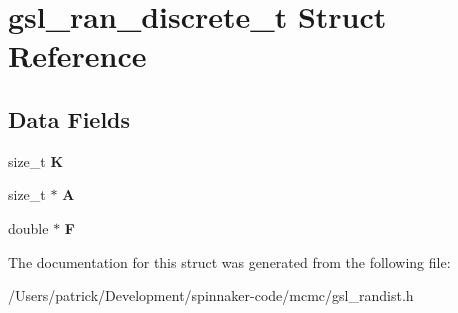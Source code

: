 \hypertarget{structgsl__ran__discrete__t}{}\section{gsl\+\_\+ran\+\_\+discrete\+\_\+t Struct Reference}
\label{structgsl__ran__discrete__t}
\subsection*{Data Fields}
\begin{DoxyCompactItemize}
\item 
size\+\_\+t {\bfseries K}\hypertarget{structgsl__ran__discrete__t_af169764abf85f85bec428e43dc60274b}{}\label{structgsl__ran__discrete__t_af169764abf85f85bec428e43dc60274b}

\item 
size\+\_\+t $\ast$ {\bfseries A}\hypertarget{structgsl__ran__discrete__t_a65edd21e80acfa33842c60633c1ab326}{}\label{structgsl__ran__discrete__t_a65edd21e80acfa33842c60633c1ab326}

\item 
double $\ast$ {\bfseries F}\hypertarget{structgsl__ran__discrete__t_aae49faeee2b5d4f2625d50eb307ff216}{}\label{structgsl__ran__discrete__t_aae49faeee2b5d4f2625d50eb307ff216}

\end{DoxyCompactItemize}


The documentation for this struct was generated from the following file\+:\begin{DoxyCompactItemize}
\item 
/\+Users/patrick/\+Development/spinnaker-\/code/mcmc/gsl\+\_\+randist.\+h\end{DoxyCompactItemize}
